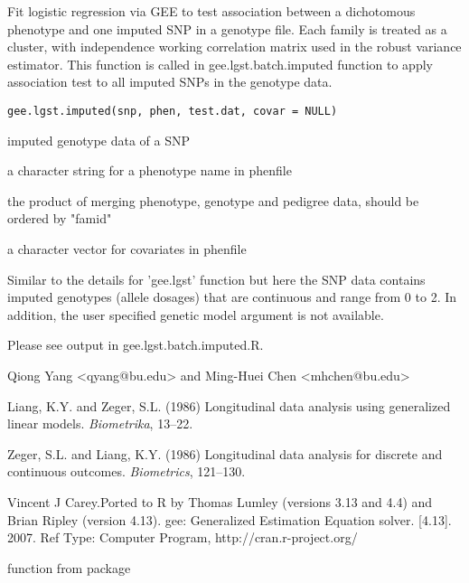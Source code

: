 \begin{Description}\relax
Fit logistic regression via GEE to test association between a dichotomous phenotype 
and one imputed SNP in a genotype file. Each family is treated as 
a cluster, with independence working correlation matrix used in the robust variance estimator.
This function is called in gee.lgst.batch.imputed function to apply association test to all imputed SNPs in the 
genotype data.
\end{Description}
\begin{Usage}
\begin{verbatim}
gee.lgst.imputed(snp, phen, test.dat, covar = NULL)
\end{verbatim}
\end{Usage}
\begin{Arguments}
\begin{ldescription}
\item[\code{snp}] imputed genotype data of a SNP
\item[\code{phen}] a character string for a phenotype name in phenfile 
\item[\code{test.dat}] the product of merging phenotype, genotype and pedigree data, should be ordered by "famid" 
\item[\code{covar}] a character vector for covariates in phenfile 
\end{ldescription}
\end{Arguments}
\begin{Details}\relax
Similar to the details for 'gee.lgst' function but here the SNP data contains imputed genotypes (allele dosages) 
that are continuous and range from 0 to 2. In addition, the user 
specified genetic model argument is not available.
\end{Details}
\begin{Value}
Please see output in gee.lgst.batch.imputed.R.
\end{Value}
\begin{Author}\relax
Qiong Yang <qyang@bu.edu> and Ming-Huei Chen <mhchen@bu.edu>
\end{Author}
\begin{References}\relax
Liang, K.Y. and Zeger, S.L. (1986)
Longitudinal data analysis using generalized linear models.
\emph{Biometrika},  13--22. 

Zeger, S.L. and Liang, K.Y. (1986)
Longitudinal data analysis for discrete and continuous outcomes.
\emph{Biometrics},  121--130.

Vincent J Carey.Ported to R by Thomas Lumley (versions 3.13 and 4.4) and Brian Ripley (version 4.13). gee: Generalized Estimation Equation solver. 
[4.13]. 2007. Ref Type: Computer Program, http://cran.r-project.org/
\end{References}
\begin{SeeAlso}\relax
{} function from package 
\end{SeeAlso}

